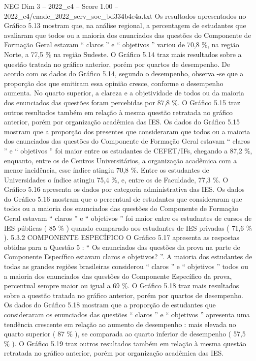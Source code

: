 \begin{textsample}{NEG Dim 3 – 2022\_c4 – Score 1.00 – 2022\_c4/enade\_2022\_serv\_soc\_bd334b4e4a.txt}
Os resultados apresentados no Gráfico 5.13 mostram que, na análise regional, a percentagem de estudantes que avaliaram que todos ou a maioria dos enunciados das questões do Componente de Formação Geral estavam “ claros ” e “ objetivos ” variou de 70,8 \%, na região Norte, a 77,5 \% na região Sudeste.
O Gráfico 5.14 traz mais resultados sobre a questão tratada no gráfico anterior, porém por quartos de desempenho.
De acordo com os dados do Gráfico 5.14, segundo o desempenho, observa -se que a proporção dos que emitiram essa opinião cresce, conforme o desempenho aumenta.
No quarto superior, a clareza e a objetividade de todos ou da maioria dos enunciados das questões foram percebidas por 87,8 \%.
O Gráfico 5.15 traz outros resultados também em relação à mesma questão retratada no gráfico anterior, porém por organização acadêmica das IES.
Os dados do Gráfico 5.15 mostram que a proporção dos presentes que consideraram que todos ou a maioria dos enunciados das questões do Componente de Formação Geral estavam “ claros ” e “ objetivos ” foi maior entre os estudantes de CEFET/IFs, chegando a 87,2 \%, enquanto, entre os de Centros Universitários, a organização acadêmica com a menor incidência, esse índice atingiu 70,8 \%.
Entre os estudantes de Universidades o índice atingiu 75,4 \%, e, entre os de Faculdade, 77,3 \%.
O Gráfico 5.16 apresenta os dados por categoria administrativa das IES.
Os dados do Gráfico 5.16 mostram que o percentual de estudantes que consideraram que todos ou a maioria dos enunciados das questões do Componente de Formação Geral estavam “ claros ” e “ objetivos ” foi maior entre os estudantes de cursos de IES públicas ( 85 \% ) quando comparado aos estudantes de IES privadas ( 71,6 \% ). 5.3.2 COMPONENTE ESPECÍFICO O Gráfico 5.17 apresenta as respostas obtidas para a Questão 5 : “ Os enunciados das questões da prova na parte de Componente Específico estavam claros e objetivos? ”.
A maioria dos estudantes de todas as grandes regiões brasileiras considerou “ claros ” e “ objetivos ” todos ou a maioria dos enunciados das questões do Componente Específico da prova, percentual sempre maior ou igual a 69 \%.
O Gráfico 5.18 traz mais resultados sobre a questão tratada no gráfico anterior, porém por quartos de desempenho.
Os dados do Gráfico 5.18 mostram que a proporção de estudantes que consideraram os enunciados das questões “ claros ” e “ objetivos ” apresenta uma tendência crescente em relação ao aumento de desempenho : mais elevada no quarto superior ( 87 \% ), se comparada ao quarto inferior de desempenho ( 57,5 \% ).
O Gráfico 5.19 traz outros resultados também em relação à mesma questão retratada no gráfico anterior, porém por organização acadêmica das IES.

\end{textsample}
